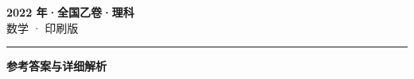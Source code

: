 \documentclass[zihao=5, a4paper]{ctexart}
\begin{document}
\begin{center}
  {\Large\bfseries 2022 年·全国乙卷·理科}\\[4pt]
  {\large 数学 · 印刷版}
\end{center}
\medskip
{}

\par\bigskip\hrule\bigskip
{}
\begin{center}{\large\bfseries 参考答案与详细解析}\end{center}
\smallskip

\end{document}
